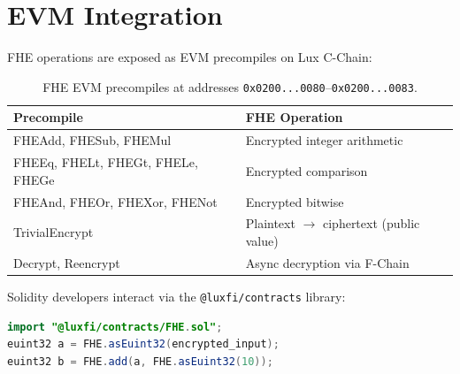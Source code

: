 

\section{EVM Integration}


FHE operations are exposed as EVM precompiles on Lux C-Chain:

\begin{table}[h]
\centering
\small
\begin{tabular}{@{}ll@{}}
\toprule
\textbf{Precompile} & \textbf{FHE Operation} \\
\midrule
FHEAdd, FHESub, FHEMul & Encrypted integer arithmetic \\
FHEEq, FHELt, FHEGt, FHELe, FHEGe & Encrypted comparison \\
FHEAnd, FHEOr, FHEXor, FHENot & Encrypted bitwise \\
TrivialEncrypt & Plaintext $\to$ ciphertext (public value) \\
Decrypt, Reencrypt & Async decryption via F-Chain \\
\bottomrule
\end{tabular}
\caption{FHE EVM precompiles at addresses \texttt{0x0200...0080}--\texttt{0x0200...0083}.}
\label{tab:precompiles}
\end{table}

Solidity developers interact via the \texttt{@luxfi/contracts} library:

\begin{lstlisting}[language=Java]
import "@luxfi/contracts/FHE.sol";
euint32 a = FHE.asEuint32(encrypted_input);
euint32 b = FHE.add(a, FHE.asEuint32(10));
\end{lstlisting}

